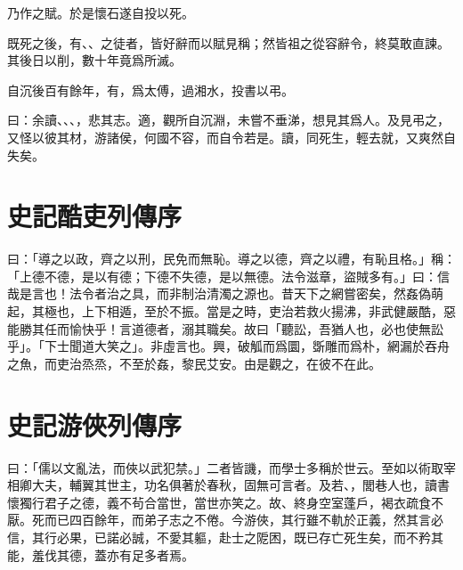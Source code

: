 乃作之賦。於是懷石遂自投以死。

既死之後，有、、之徒者，皆好辭而以賦見稱；然皆祖之從容辭令，終莫敢直諫。其後日以削，數十年竟爲所滅。

自沉後百有餘年，有，爲太傅，過湘水，投書以弔。

曰：余讀、、、，悲其志。適，觀所自沉淵，未嘗不垂涕，想見其爲人。及見弔之，又怪以彼其材，游諸侯，何國不容，而自令若是。讀，同死生，輕去就，又爽然自失矣。

\theendnotes

\section[酷吏列傳序\quad{\small 史記}]{{\normalsize 史記}\quad 酷吏列傳序}
曰：「導之以政，齊之以刑，民免而無恥。導之以德，齊之以禮，有恥且格。」稱：「上德不德，是以有德；下德不失德，是以無德。法令滋章，盜賊多有。」曰：信哉是言也！法令者治之具，而非制治清濁之源也。昔天下之網嘗密矣，然姦偽萌起，其極也，上下相遁，至於不振。當是之時，吏治若救火揚沸，非武健嚴酷，惡能勝其任而愉快乎！言道德者，溺其職矣。故曰「聽訟，吾猶人也，必也使無訟乎」。「下士聞道大笑之」。非虛言也。興，破觚而爲圜，斲雕而爲朴，網漏於吞舟之魚，而吏治烝烝，不至於姦，黎民艾安。由是觀之，在彼不在此。

\theendnotes

\section[游俠列傳序\quad{\small 史記}]{{\normalsize 史記}\quad 游俠列傳序}
曰：「儒以文亂法，而俠以武犯禁。」二者皆譏，而學士多稱於世云。至如以術取宰相卿大夫，輔翼其世主，功名俱著於春秋，固無可言者。及若、，閭巷人也，讀書懷獨行君子之德，義不茍合當世，當世亦笑之。故、終身空室蓬戶，褐衣疏食不厭。死而已四百餘年，而弟子志之不倦。今游俠，其行雖不軌於正義，然其言必信，其行必果，已諾必誠，不愛其軀，赴士之阸困，既已存亡死生矣，而不矜其能，羞伐其德，蓋亦有足多者焉。

